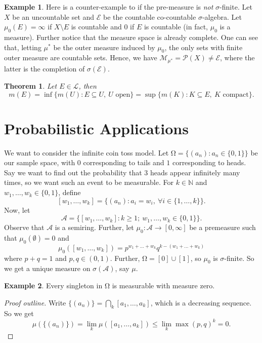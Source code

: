 \documentclass[letterpaper,12pt]{article}
\theoremstyle{definition}
\newtheorem{example}{Example}[section]
\theoremstyle{plain}
\newtheorem{thm}{Theorem}[section]
\theoremstyle{remark}
\newcommand{\N}{\mathbb{N}}
\let\oldOmega\Omega
\renewcommand{\Omega}{\mathrm{\oldOmega}}
\begin{document}
\begin{example}
Here is a counter-example to  if the pre-measure is \emph{not} $\sigma$-finite. Let $X$ be an uncountable set and $\mathcal{E}$ be the countable co-countable $\sigma$-algebra. Let $\mu_0(E)=\infty$ if $X\setminus E$ is countable and $0$ if $E$ is countable (in fact, $\mu_0$ is a measure). Further notice that the measure space is already complete. One can see that, letting $\mu^*$ be the outer measure induced by $\mu_0$, the only sets with finite outer measure are countable sets. Hence, we have $\mathcal{M}_{\mu^*} = \mathcal{P}(X)\neq \mathcal{E}$, where the latter is the completion of $\sigma(\mathcal{E})$.
\end{example}

\begin{thm}
Let $E\in \mathcal{L}$, then
\[m(E) = \inf\{m(U):E\subseteq U,\ U\text{ open}\}= \sup\{m(K):K\subseteq E,\ K\text{ compact}\}.\]
\end{thm}

\section{Probabilistic Applications}
We want to consider the infinite coin toss model. Let $\Omega = \{(a_n):a_n\in\{0,1\}\}$ be our sample space, with $0$ corresponding to tails and $1$ corresponding to heads. Say we want to find out the probability that 3 heads appear infinitely many times, so we want such an event to be measurable. For $k\in\N$ and $w_1,\ldots,w_k\in\{0,1\}$, define
\[[w_1,\ldots,w_k] = \{(a_n):a_i=w_i,\ \forall i\in\{1,\ldots,k\}\}.\]
Now, let
\[\mathcal{A} = \{[w_1,\ldots,w_k]:k\geq 1;\ w_1,\ldots,w_k\in\{0,1\}\}.\]
Observe that $\mathcal{A}$ is a semiring. Further, let $\mu_0:\mathcal{A}\to[0,\infty]$ be a premeasure such that $\mu_0(\emptyset)=0$ and
\[\mu_0([w_1,\ldots,w_k]) = p^{w_1+\ldots+w_k}q^{k-(w_1+\ldots+w_k)}\]
where $p+q=1$ and $p,q\in(0,1)$. Further, $\Omega = [0]\cup[1]$, so $\mu_0$ is $\sigma$-finite. So we get a unique measure on $\sigma(\mathcal{A})$, say $\mu$.

\begin{example}
Every singleton in $\Omega$ is measurable with measure zero.
\end{example}

\begin{proof}[Proof outline]
Write $\{(a_n)\} = \bigcap_k [a_1,\ldots,a_k]$, which is a decreasing sequence. So we get
\[\mu(\{(a_n)\}) = \lim_k \mu([a_1,\ldots,a_k])\leq \lim_k \max(p,q)^k = 0.\]
\end{proof}
\end{document}
